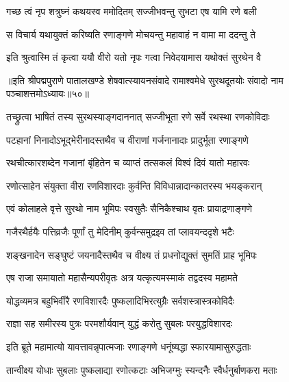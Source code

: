 \twolineshloka
{गच्छ त्वं नृप शत्रुघ्नं कथयस्व ममोदितम्}
{सज्जीभवन्तु सुभटा एष यामि रणे बली}%

\twolineshloka
{स विचार्य यथायुक्तं करिष्यति रणाङ्गणे}
{मोचयन्तु महावाहं न वामा मा ददन्तु ते}%


\twolineshloka
{इति श्रुत्वास्मि तं कृत्वा ययौ वीरो यतो नृपः}
{गत्वा निवेदयामास यथोक्तं सुरथेन वै}%

{॥इति श्रीपद्मपुराणे पातालखण्डे शेषवात्स्यायनसंवादे रामाश्वमेधे सुरथदूतयोः संवादो नाम पञ्चाशत्तमोऽध्यायः॥५०॥}



\twolineshloka
{तच्छ्रुत्वा भाषितं तस्य सुरथस्याङ्गदाननात्}
{सज्जीभूता रणे सर्वे रथस्था रणकोविदाः}%

\twolineshloka
{पटहानां निनादोऽभूद्भेरीनादस्तथैव च}
{वीराणां गर्जनानादाः प्रादुर्भूता रणाङ्गणे}%

\twolineshloka
{रथचीत्कारशब्देन गजानां बृंहितेन च}
{व्याप्तं तत्सकलं विश्वं दिवं यातो महारवः}%

\twolineshloka
{रणोत्साहेन संयुक्ता वीरा रणविशारदाः}
{कुर्वन्ति विविधान्नादान्कातरस्य भयङ्करान्}%

\twolineshloka
{एवं कोलाहले वृत्ते सुरथो नाम भूमिपः}
{स्वसुतैः सैनिकैश्चाथ वृतः प्रायाद्रणाङ्गणे}%

\twolineshloka
{गजैरथैर्हयैः पत्तिव्रजैः पूर्णां तु मेदिनीम्}
{कुर्वन्समुद्रइव तां प्लावयन्ददृशे भटैः}%

\twolineshloka
{शङ्खनादेन सङ्घुष्टं जयनादैस्तथैव च}
{वीक्ष्य तं प्रधनोद्युक्तं सुमतिं प्राह भूमिपः}%


\twolineshloka
{एष राजा समायातो महासैन्यपरीवृतः}
{अत्र यत्कृत्यमस्माकं तद्वदस्व महामते}%


\twolineshloka
{योद्धव्यमत्र बहुभिर्वीरै रणविशारदैः}
{पुष्कलादिभिरत्युग्रैः सर्वशस्त्रास्त्रकोविदैः}%

\twolineshloka
{राज्ञा सह समीरस्य पुत्रः परमशौर्यवान्}
{युद्धं करोतु सुबलः परयुद्धविशारदः}%


\twolineshloka
{इति ब्रूते महामात्यो यावत्तावन्नृपात्मजाः}
{रणाङ्गणे धनूंष्यद्धा स्फारयामासुरुद्धताः}%

\twolineshloka
{तान्वीक्ष्य योधाः सुबलाः पुष्कलाद्या रणोत्कटाः}
{अभिजग्मुः स्यन्दनैः स्वैर्धनुर्बाणकरा मताः}%

